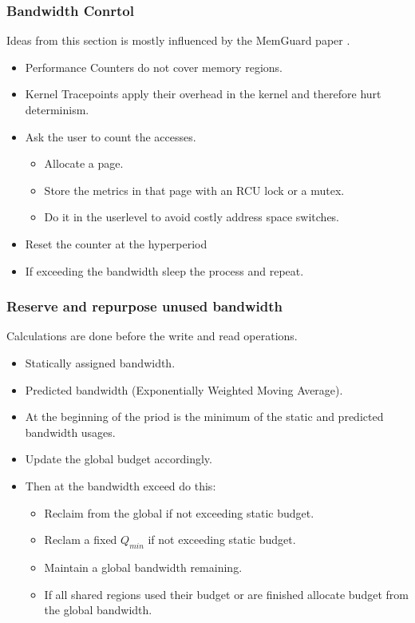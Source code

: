 \documentclass{beamer}
\begin{document}
\begin{frame}
    \frametitle{Bandwidth Conrtol}
    Ideas from this section is mostly influenced by the MemGuard paper
    \cite{yun2013memguard}.
    \begin{itemize}
        \item Performance Counters do not cover memory regions.
        \item Kernel Tracepoints apply their overhead in the kernel and
            therefore hurt determinism.
        \item Ask the user to count the accesses.
            \begin{itemize}
                \item Allocate a page.
                \item Store the metrics in that page with an RCU lock or a
                    mutex.
                \item Do it in the userlevel to avoid costly address space
                    switches.
            \end{itemize}
        \item Reset the counter at the hyperperiod
        \item If exceeding the bandwidth sleep the process and repeat.
    \end{itemize}
\end{frame}

\begin{frame}
    \frametitle{Reserve and repurpose unused bandwidth}
    Calculations are done before the write and read operations.
    \begin{itemize}
        \item Statically assigned bandwidth.
        \item Predicted bandwidth (Exponentially Weighted Moving Average).
        \item At the beginning of the priod is the minimum of the static and
            predicted bandwidth usages.
        \item Update the global budget accordingly.
        \item Then at the bandwidth exceed do this:
            \begin{itemize}
                \item Reclaim from the global if not exceeding static budget.
                \item Reclam a fixed $Q_{min}$ if not exceeding static budget.
                \item Maintain a global bandwidth remaining.
                \item If all shared regions used their budget or are finished
                    allocate budget from the global bandwidth.
            \end{itemize}
    \end{itemize}
\end{frame}
\end{document}
